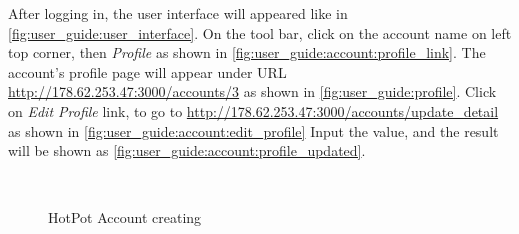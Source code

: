 After logging in, the user interface will appeared like in \autoref{fig:user_guide:user_interface}.
On the tool bar, click on the account name on left top corner, then \emph{Profile} as shown in \autoref{fig:user_guide:account:profile_link}.
The account's profile page will appear under URL \href{http://178.62.253.47:3000/accounts/3}{http://178.62.253.47:3000/accounts/3} as shown in \autoref{fig:user_guide:profile}.
Click on \emph{Edit Profile} link, to go to \href{http://178.62.253.47:3000/accounts/update\_detail}{http://178.62.253.47:3000/accounts/update\_detail} as shown in 
\autoref{fig:user_guide:account:edit_profile}
Input the value, and the result will be shown as \autoref{fig:user_guide:account:profile_updated}.

\begin{figure}[bth]
\myfloatalign
{} \quad
{} \\
\caption[HotPot Account creation]{HotPot Account creating}
\label{fig:user_guide:account:edit_profile}
\end{figure}

